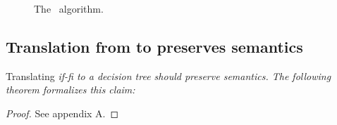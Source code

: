 \documentclass[manuscript,screen,review, 12pt, nonacm]{acmart}
\begin{document}
\begin{figure}[H]


    \caption{The \DTran\ algorithm.}
    \label{dtran}
    \end{figure}    



    \subsection{Translation from \VMinus to \D preserves semantics}
    
    Translating \it{if-fi} to a decision tree should preserve semantics. The
    following theorem formalizes this claim: 

    \begin{proof}
        See appendix A. 
    \end{proof}
\end{document}
